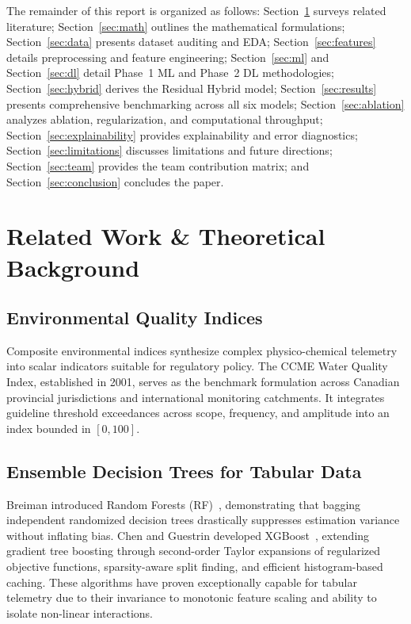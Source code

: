 \documentclass[conference]{IEEEtran}
\begin{document}
The remainder of this report is organized as follows: Section~\ref{sec:related} surveys related literature; Section~\ref{sec:math} outlines the mathematical formulations; Section~\ref{sec:data} presents dataset auditing and EDA; Section~\ref{sec:features} details preprocessing and feature engineering; Section~\ref{sec:ml} and Section~\ref{sec:dl} detail Phase~1 ML and Phase~2 DL methodologies; Section~\ref{sec:hybrid} derives the Residual Hybrid model; Section~\ref{sec:results} presents comprehensive benchmarking across all six models; Section~\ref{sec:ablation} analyzes ablation, regularization, and computational throughput; Section~\ref{sec:explainability} provides explainability and error diagnostics; Section~\ref{sec:limitations} discusses limitations and future directions; Section~\ref{sec:team} provides the team contribution matrix; and Section~\ref{sec:conclusion} concludes the paper.

\section{Related Work \& Theoretical Background}
\label{sec:related}

\subsection{Environmental Quality Indices}
Composite environmental indices synthesize complex physico-chemical telemetry into scalar indicators suitable for regulatory policy. The CCME Water Quality Index, established in 2001, serves as the benchmark formulation across Canadian provincial jurisdictions and international monitoring catchments. It integrates guideline threshold exceedances across scope, frequency, and amplitude into an index bounded in $[0, 100]$.

\subsection{Ensemble Decision Trees for Tabular Data}
Breiman introduced Random Forests (RF)~\cite{breiman2001random}, demonstrating that bagging independent randomized decision trees drastically suppresses estimation variance without inflating bias. Chen and Guestrin developed XGBoost~\cite{chen2016xgboost}, extending gradient tree boosting through second-order Taylor expansions of regularized objective functions, sparsity-aware split finding, and efficient histogram-based caching. These algorithms have proven exceptionally capable for tabular telemetry due to their invariance to monotonic feature scaling and ability to isolate non-linear interactions.
\end{document}
